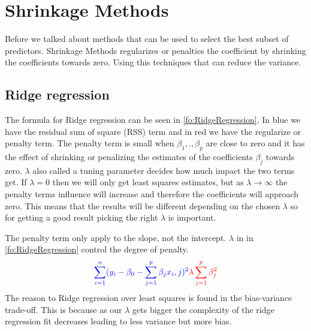 \chapter{Shrinkage Methods} \label{ch:shrinkageMethods}
Before we talked about methods that can be used to select the best subset of predictors. Shrinkage Methods regularizes or penalties the coefficient by shrinking the coefficients towards zero. Using this techniques that can reduce the variance. 

\section{Ridge regression}

The formula for Ridge regression can be seen in \ref{fo:RidgeRegression}. In blue we have the residual sum of square (RSS) term and in red we have the regularize or penalty term. The penalty term is small when $\beta_1, . ,\beta_p$ are close to zero and it has the effect of shrinking or penalizing the estimates of the coefficients $\beta_j$ towards zero. $\lambda$ also called a tuning parameter decides how much impact the two terms get. If $\lambda = 0$ then we will only get least squares estimates, but as $ \lambda \to \infty$ the penalty terms influence will increase and therefore the coefficients will approach zero. This means that the results will be different depending on the chosen $\lambda$ so for getting a good result picking the right $\lambda$ is important.

\noindent The penalty term only apply to the slope, not the intercept. $\lambda$ in in \ref{fo:RidgeRegression} control the degree of penalty.
\begin{align}\label{fo:RidgeRegression}
\color{blue} \sum_{i=1}^{n} ( y_i - \beta_0 - \sum_{j=1}^{p} \beta_j x_i,j )^2  \color{red} \lambda \sum_{j=1}^{p} \beta^2_j 
\end{align}
The reason to Ridge regression over least squares is found in the bias-variance
trade-off. This is because as our $\lambda$ gets bigger the complexity of the ridge regression fit decreases leading to less variance but more bias.

